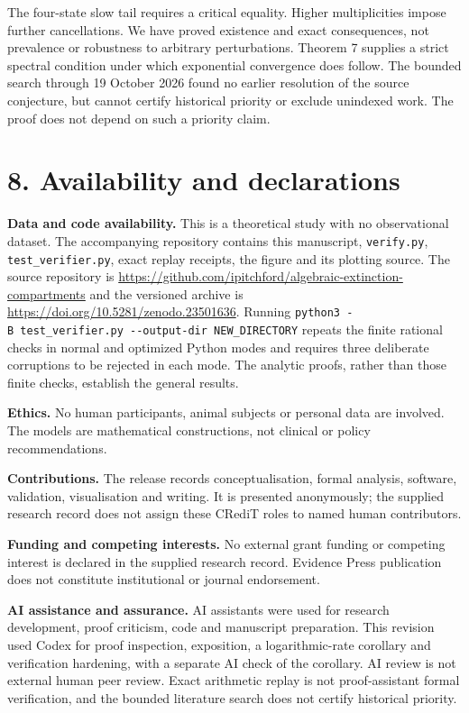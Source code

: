 \documentclass[
  11pt,
  a4paper,
]{scrartcl}
\begin{document}
The four-state slow tail requires a critical equality. Higher
multiplicities impose further cancellations. We have proved existence
and exact consequences, not prevalence or robustness to arbitrary
perturbations. Theorem 7 supplies a strict spectral condition under
which exponential convergence does follow. The bounded search through 19
October 2026 found no earlier resolution of the source conjecture, but
cannot certify historical priority or exclude unindexed work. The proof
does not depend on such a priority claim.

\section{8. Availability and
declarations}\label{availability-and-declarations}

\textbf{Data and code availability.} This is a theoretical study with no
observational dataset. The accompanying repository contains this
manuscript, \texttt{verify.py}, \texttt{test\_verifier.py}, exact replay
receipts, the figure and its plotting source. The source repository is
\url{https://github.com/ipitchford/algebraic-extinction-compartments}
and the versioned archive is
\url{https://doi.org/10.5281/zenodo.23501636}. Running
\texttt{python3\ -B\ test\_verifier.py\ -\/-output-dir\ NEW\_DIRECTORY}
repeats the finite rational checks in normal and optimized Python modes
and requires three deliberate corruptions to be rejected in each mode.
The analytic proofs, rather than those finite checks, establish the
general results.

\textbf{Ethics.} No human participants, animal subjects or personal data
are involved. The models are mathematical constructions, not clinical or
policy recommendations.

\textbf{Contributions.} The release records conceptualisation, formal
analysis, software, validation, visualisation and writing. It is
presented anonymously; the supplied research record does not assign
these CRediT roles to named human contributors.

\textbf{Funding and competing interests.} No external grant funding or
competing interest is declared in the supplied research record. Evidence
Press publication does not constitute institutional or journal
endorsement.

\textbf{AI assistance and assurance.} AI assistants were used for
research development, proof criticism, code and manuscript preparation.
This revision used Codex for proof inspection, exposition, a
logarithmic-rate corollary and verification hardening, with a separate
AI check of the corollary. AI review is not external human peer review.
Exact arithmetic replay is not proof-assistant formal verification, and
the bounded literature search does not certify historical priority.
\end{document}
